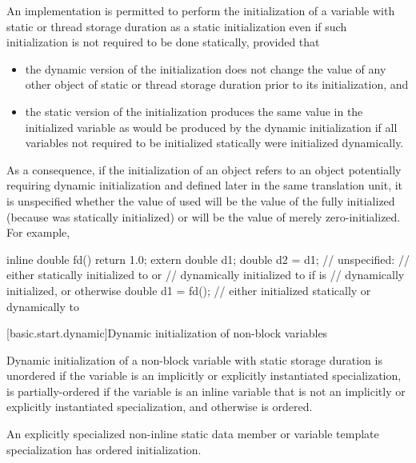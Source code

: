 \pnum
An implementation is permitted to perform the initialization of a
variable with static or thread storage duration as a static
initialization even if such initialization is not required to be done
statically, provided that
\begin{itemize}
\item
the dynamic version of the initialization does not change the
value of any other object of static or thread storage duration
prior to its initialization, and

\item
the static version of the initialization produces the same value
in the initialized variable as would be produced by the dynamic
initialization if all variables not required to be initialized statically
were initialized dynamically.
\end{itemize}
\begin{note}
As a consequence, if the initialization of an object  refers to an
object  potentially requiring dynamic initialization and defined
later in the same translation unit, it is unspecified whether the value of  used
will be the value of the fully initialized  (because  was statically
initialized) or will be the value of  merely zero-initialized. For example,
\begin{codeblock}
inline double fd() { return 1.0; }
extern double d1;
double d2 = d1;     // unspecified:
                    // either statically initialized to  or
                    // dynamically initialized to  if  is
                    // dynamically initialized, or  otherwise
double d1 = fd();   // either initialized statically or dynamically to 
\end{codeblock}
\end{note}

[basic.start.dynamic]{Dynamic initialization of non-block variables}

\pnum
{}%
%
%
Dynamic initialization of a non-block variable with static storage duration is
unordered if the variable is an implicitly or explicitly instantiated
specialization, is partially-ordered if the variable
is an inline variable that is not an implicitly or explicitly instantiated
specialization, and otherwise is ordered.
\begin{note}
An explicitly specialized non-inline static data member or
variable template specialization has ordered initialization.
\end{note}

